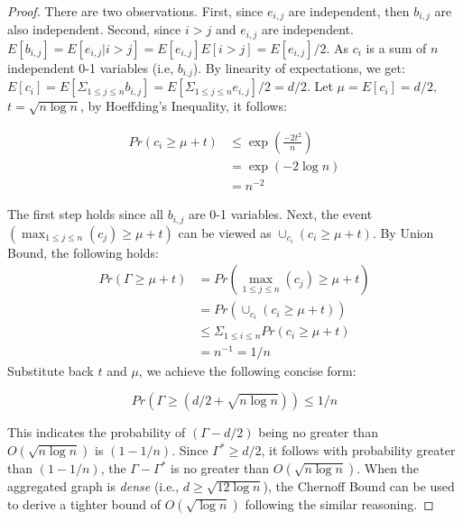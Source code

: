 \begin{proof}
There are two observations. First, since $e_{i,j}$ are independent,
then $b_{i,j}$ are also independent. Second, since $i>j$ and $e_{i,j}$ are independent. 
$E[b_{i,j}] = E[e_{i,j} | i>j]= E[e_{i,j}]E[i>j]= E[e_{i,j}]/2$.
As $c_i$ is a sum of $n$ independent 0-1 variables (i.e, $b_{i.j}$). By linearity 
of expectations,
we get: $E[c_i] = E[\Sigma_{1\leq j \leq n} b_{i,j}]=E[\Sigma_{1\leq j \leq n} e_{i,j}]/2 = d/2$.
 Let $\mu =E[c_i] = d/2$, 
$t = \sqrt{n\log n}$, by Hoeffding's Inequality, it follows:

\begin{equation*}
\begin{split}
	Pr(c_i \geq \mu + t) &\leq \exp(\frac{-2t^2}{n}) \\
	&= \exp(-2\log n) \\
	&= n^{-2}
\end{split}
\end{equation*}

The first step holds since all $b_{i,j}$ are 0-1 variables. 
Next, the event $(\max_{1 \leq j \leq n}(c_j) \geq \mu + t)$ can be viewed as
$\cup_{c_i} (c_i \geq \mu + t )$. By Union Bound, the following holds:
\begin{equation*}
\begin{split}
	Pr(\Gamma \geq \mu + t) &=Pr(\max_{1\leq j \leq n}(c_j) \geq \mu + t)  \\
		& = Pr(\cup_{c_i} (c_i \geq \mu + t )) \\
		&\leq \Sigma_{1 \leq i \leq n} Pr(c_i \geq \mu + t) \\ 
		&= n^{-1} = 1/n
\end{split}
\end{equation*}
Substitute back $t$ and $\mu$, we achieve the following concise form:

\begin{equation*}
	Pr(\Gamma \geq (d/2 + \sqrt{n\log n})) \leq 1/n
\end{equation*}

This indicates the probability of $(\Gamma-d/2)$ being no greater than $ O(\sqrt{n\log n})$ is $(1-1/n)$. 
Since $\Gamma^* \geq d/2$, it follows with probability greater than $(1-1/n)$, 
the $\Gamma - \Gamma^*$ is no greater than $O(\sqrt{n\log n})$.
When the aggregated graph is \emph{dense} (i.e., $d\geq \sqrt{12 \log n}$),
the Chernoff Bound can be used to derive a tighter bound of 
$O(\sqrt{\log n}) $ following the similar reasoning.
\end{proof}

